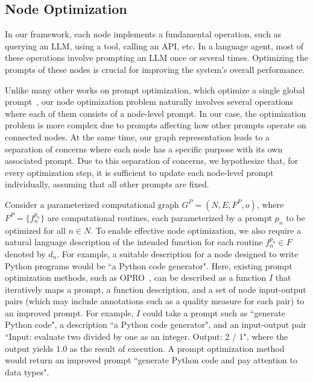 \documentclass{article}
\theoremstyle{plain}
\theoremstyle{definition}
\theoremstyle{remark}
\begin{document}
\subsection{Node Optimization}

\label{sec:node_opt}
In our framework, each node implements a fundamental operation, such as querying an LLM, using a tool, calling an API, etc. 
In a language agent, most of these operations involve prompting an LLM once or several times.
Optimizing the prompts of these nodes is crucial for improving the system's overall performance.

Unlike many other works on prompt optimization, which optimize a single global prompt~\citep[e.g.,][]{yang2023large,pryzant2023automatic,deng2022rlprompt}, our node optimization problem naturally involves several operations where each of them consists of a node-level prompt.
In our case, the optimization problem is more complex due to prompts affecting how other prompts operate on connected nodes.
At the same time, our graph representation leads to a separation of concerns where each node has a specific purpose with its own associated prompt.
Due to this separation of concerns, we hypothesize that, for every optimization step, it is sufficient to update each node-level prompt individually, assuming that all other prompts are fixed.

Consider a parameterized computational graph $G^P = (N, E, F^P, o)$, where $F^P = \{f_n^{p_n}\}$ are computational routines, each parameterized by a prompt $p_n$ to be optimized for all $n \in N$.
To enable effective node optimization, we also require a natural language description of the intended function for each routine $f_n^{p_n} \in F$ denoted by $d_n$.
For example, a suitable description for a node designed to write Python programs would be ``a Python code generator".
Here, existing prompt optimization methods, such as OPRO~\citep{yang2023large}, can be described as a function $I$ that iteratively maps a prompt, a function description, and a set of node input-output pairs (which may include annotations such as a quality measure for each pair) to an improved prompt.
For example, $I$ could take a prompt such as ``generate Python code", a description ``a Python code generator", and an input-output pair ``Input: evaluate two divided by one as an integer. Output: 2 / 1", where the output yields $1.0$ as the result of execution. A prompt optimization method would return an improved prompt ``generate Python code and pay attention to data types".
\end{document}
